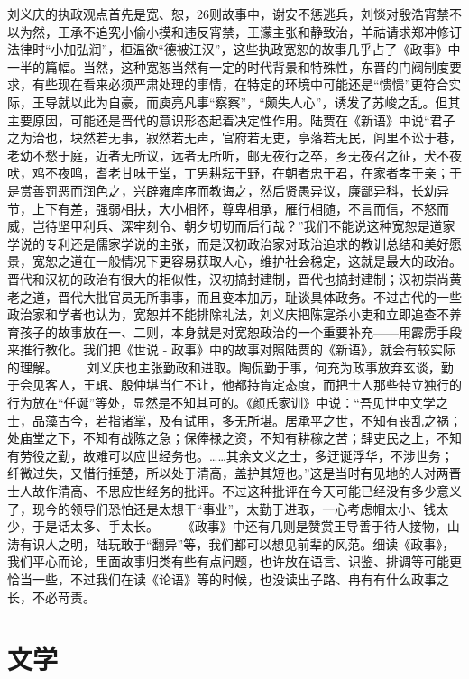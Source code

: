 \documentclass[]{book}
\begin{document}
刘义庆的执政观点首先是宽、恕，26则故事中，谢安不惩逃兵，刘惔对殷浩宵禁不以为然，王承不追究小偷小摸和违反宵禁，王濛主张和静致治，羊祜请求郑冲修订法律时``小加弘润''，桓温欲``德被江汉''，这些执政宽恕的故事几乎占了《政事》中一半的篇幅。当然，这种宽恕当然有一定的时代背景和特殊性，东晋的门阀制度要求，有些现在看来必须严肃处理的事情，在特定的环境中可能还是``愦愦''更符合实际，王导就以此为自豪，而庾亮凡事``察察''，``颇失人心''，诱发了苏峻之乱。但其主要原因，可能还是晋代的意识形态起着决定性作用。陆贾在《新语》中说``君子之为治也，块然若无事，寂然若无声，官府若无吏，亭落若无民，闾里不讼于巷，老幼不愁于庭，近者无所议，远者无所听，邮无夜行之卒，乡无夜召之征，犬不夜吠，鸡不夜鸣，耆老甘味于堂，丁男耕耘于野，在朝者忠于君，在家者孝于亲；于是赏善罚恶而润色之，兴辟雍庠序而教诲之，然后贤愚异议，廉鄙异科，长幼异节，上下有差，强弱相扶，大小相怀，尊卑相承，雁行相随，不言而信，不怒而威，岂待坚甲利兵、深牢刻令、朝夕切切而后行哉？''我们不能说这种宽恕是道家学说的专利还是儒家学说的主张，而是汉初政治家对政治追求的教训总结和美好愿景，宽恕之道在一般情况下更容易获取人心，维护社会稳定，这就是最大的政治。晋代和汉初的政治有很大的相似性，汉初搞封建制，晋代也搞封建制；汉初崇尚黄老之道，晋代大批官员无所事事，而且变本加厉，耻谈具体政务。不过古代的一些政治家和学者也认为，宽恕并不能排除礼法，刘义庆把陈寔杀小吏和立即追查不养育孩子的故事放在一、二则，本身就是对宽恕政治的一个重要补充------用霹雳手段来推行教化。我们把《世说
- 政事》中的故事对照陆贾的《新语》，就会有较实际的理解。
　　刘义庆也主张勤政和进取。陶侃勤于事，何充为政事放弃玄谈，勤于会见客人，王珉、殷仲堪当仁不让，他都持肯定态度，而把士人那些特立独行的行为放在``任诞''等处，显然是不知其可的。《颜氏家训》中说：``吾见世中文学之士，品藻古今，若指诸掌，及有试用，多无所堪。居承平之世，不知有丧乱之祸；处庙堂之下，不知有战陈之急；保俸禄之资，不知有耕稼之苦；肆吏民之上，不知有劳役之勤，故难可以应世经务也。\ldots{}\ldots{}其余文义之士，多迂诞浮华，不涉世务；纤微过失，又惜行捶楚，所以处于清高，盖护其短也。''这是当时有见地的人对两晋士人故作清高、不思应世经务的批评。不过这种批评在今天可能已经没有多少意义了，现今的领导们恐怕还是太想干``事业''，太勤于进取，一心考虑帽太小、钱太少，于是话太多、手太长。
　　《政事》中还有几则是赞赏王导善于待人接物，山涛有识人之明，陆玩敢于``翻异''等，我们都可以想见前辈的风范。细读《政事》，我们平心而论，里面故事归类有些有点问题，也许放在语言、识鉴、排调等可能更恰当一些，不过我们在读《论语》等的时候，也没读出子路、冉有有什么政事之长，不必苛责。

\chapter{文学}
\end{document}
